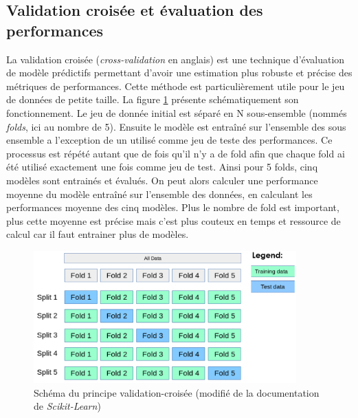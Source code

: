 \subsection{Validation croisée et évaluation des performances}
La validation croisée (\textit{cross-validation }en anglais) est une technique d'évaluation de modèle prédictifs permettant d'avoir une estimation plus robuste et précise des métriques de performances. Cette méthode est particulièrement utile pour le jeu de données de petite taille. La figure \ref{fig:cross-val} présente schématiquement son fonctionnement. Le jeu de donnée initial est séparé en N sous-ensemble (nommés \textit{folds}, ici au nombre de 5). Ensuite le modèle est entraîné sur l'ensemble des sous ensemble a l'exception de un utilisé comme jeu de teste des performances. Ce processus est répété autant que de fois qu'il n'y a de fold afin que chaque fold ai été utilisé exactement une fois comme jeu de test. Ainsi pour 5 folds, cinq modèles sont entrainés et évalués. On peut alors calculer une performance moyenne du modèle entraîné sur l'ensemble des données, en calculant les performances moyenne des cinq modèles. Plus le nombre de fold est important, plus cette moyenne est précise mais c'est plus couteux en temps et ressource de calcul car il faut entrainer plus de modèles.
\begin{figure}[!htbp]
 \centering
 \includegraphics[width=0.9\textwidth]{figures/cross-val.png}
 \caption[Schéma validation-croisée]{Schéma du principe validation-croisée (modifié de la documentation de \textit{Scikit-Learn})}
 \label{fig:cross-val}
\end{figure}
